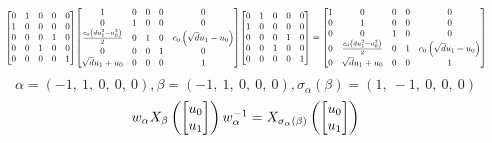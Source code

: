 \documentclass[11pt]{article}
\theoremstyle{definition}
\begin{document}
\[
\scaletoalign{\textwidth}{{\left[\begin{matrix}0 & 1 & 0 & 0 & 0\\1 & 0 & 0 & 0 & 0\\0 & 0 & 0 & 1 & 0\\0 & 0 & 1 & 0 & 0\\0 & 0 & 0 & 0 & 1\end{matrix}\right]} {\left[\begin{matrix}1 & 0 & 0 & 0 & 0\\0 & 1 & 0 & 0 & 0\\\frac{c_{0} \left(d u_{1}^{2} - u_{0}^{2}\right)}{2} & 0 & 1 & 0 & c_{0} \left(\sqrt{d} u_{1} - u_{0}\right)\\0 & 0 & 0 & 1 & 0\\\sqrt{d} u_{1} + u_{0} & 0 & 0 & 0 & 1\end{matrix}\right]} {\left[\begin{matrix}0 & 1 & 0 & 0 & 0\\1 & 0 & 0 & 0 & 0\\0 & 0 & 0 & 1 & 0\\0 & 0 & 1 & 0 & 0\\0 & 0 & 0 & 0 & 1\end{matrix}\right]} = {\left[\begin{matrix}1 & 0 & 0 & 0 & 0\\0 & 1 & 0 & 0 & 0\\0 & 0 & 1 & 0 & 0\\0 & \frac{c_{0} \left(d u_{1}^{2} - u_{0}^{2}\right)}{2} & 0 & 1 & c_{0} \left(\sqrt{d} u_{1} - u_{0}\right)\\0 & \sqrt{d} u_{1} + u_{0} & 0 & 0 & 1\end{matrix}\right]}}
\]
\[
\alpha = \left( -1, \  1, \  0, \  0, \  0\right), \beta = \left( -1, \  1, \  0, \  0, \  0\right), \sigma_{\alpha}(\beta) = \left( 1, \  -1, \  0, \  0, \  0\right)
\]
\[
\scaletoalign{\textwidth}{w_{\alpha} X_{\beta}\left(\left[\begin{matrix}u_{0}\\u_{1}\end{matrix}\right]\right) w_{\alpha}^{-1} = X_{\sigma_{\alpha}\left(\beta\right)}\left(\left[\begin{matrix}u_{0}\\u_{1}\end{matrix}\right]\right)}
\]
\end{document}
